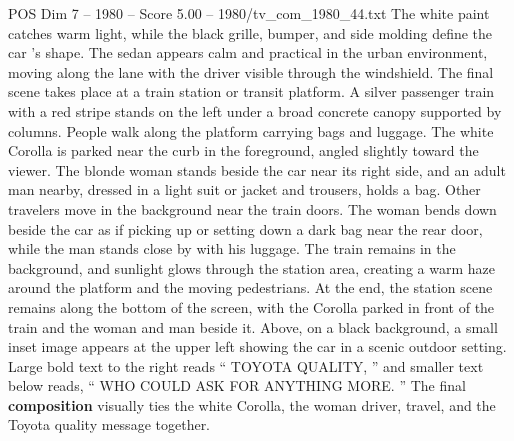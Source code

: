 \begin{textsample}{POS Dim 7 – 1980 – Score 5.00 – 1980/tv\_com\_1980\_44.txt}
The white paint catches warm light, while the black grille, bumper, and side molding define the car ’s shape.
The sedan appears calm and practical in the urban environment, moving along the lane with the driver visible through the windshield.
The final scene takes place at a train station or transit platform.
A silver passenger train with a red stripe stands on the left under a broad concrete canopy supported by columns.
People walk along the platform carrying bags and luggage.
The white Corolla is parked near the curb in the foreground, angled slightly toward the viewer.
The blonde woman stands beside the car near its right side, and an adult man nearby, dressed in a light suit or jacket and trousers, holds a bag.
Other travelers move in the background near the train doors.
The woman bends down beside the car as if picking up or setting down a dark bag near the rear door, while the man stands close by with his luggage.
The train remains in the background, and sunlight glows through the station area, creating a warm haze around the platform and the moving pedestrians.
At the end, the station scene remains along the bottom of the screen, with the Corolla parked in front of the train and the woman and man beside it.
Above, on a black background, a small inset image appears at the upper left showing the car in a scenic outdoor setting.
Large bold text to the right reads “ TOYOTA QUALITY, ” and smaller text below reads, “ WHO COULD ASK FOR ANYTHING MORE. ” The final \textbf{composition} visually ties the white Corolla, the woman driver, travel, and the Toyota quality message together.

\end{textsample}

